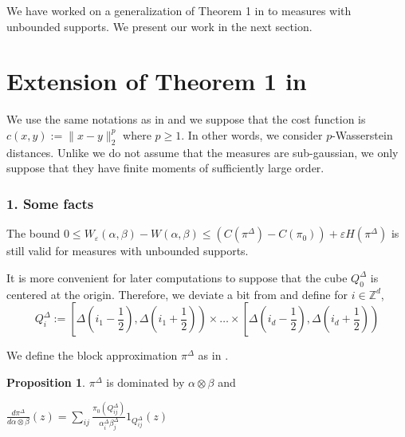 \documentclass[12pt]{report}
\theoremstyle{definition}
\newtheorem{prop}[defi]{Proposition}
\theoremstyle{remark}
\begin{document}
\par We have worked on a generalization of Theorem 1 in \cite{genevay2018sample} to measures with unbounded supports. We present our work in the next section.

\newpage
\section{Extension of Theorem 1 in \cite{genevay2018sample}}

\hspace{\parindent} We use the same notations as in \cite{genevay2018sample} and we suppose that the cost function is $c(x,y):= \|x-y\|_2^p$ where $p\geq 1$. In other words, we consider $p$-Wasserstein distances. Unlike \cite{mena2019statistical} we do not assume that the measures are sub-gaussian, we only suppose that they have finite moments of sufficiently large order.

\subsubsection*{1. Some facts}
\hspace{\parindent}The bound $0 \leqslant W_{\varepsilon}(\alpha, \beta)-W(\alpha, \beta) \leqslant\left(C(\pi^{\Delta})-C(\pi_{0})\right)+\varepsilon H(\pi^{\Delta})$ is still valid for measures with unbounded supports. 

It is more convenient for later computations to suppose that the cube $Q_0^\Delta$ is centered at the origin. Therefore, we deviate a bit from \cite{genevay2018sample} and define for $i\in \mathbb Z^d$, $$Q_i^\Delta := \left[\Delta\left(i_1-\frac 12\right), \Delta\left(i_1+\frac 12\right)  \right)\times \ldots \times \left[\Delta\left(i_d-\frac 12\right), \Delta\left(i_d+\frac 12\right)  \right)$$

We define the block approximation $\pi^{\Delta}$ as in \cite{genevay2018sample}.

\begin{prop}
	$\pi^{\Delta}$ is dominated by $\alpha\otimes \beta$ and 
	\begin{center}
		$\displaystyle \frac{d\pi^\Delta}{d\alpha \otimes\beta}(z)=  \sum_{ij} \frac{\pi_0(Q_{ij}^\Delta)}{\alpha_i^\Delta\beta_j^\Delta} 1_{Q_{ij}^\Delta}(z)$
	\end{center}
\end{prop}
\end{document}
